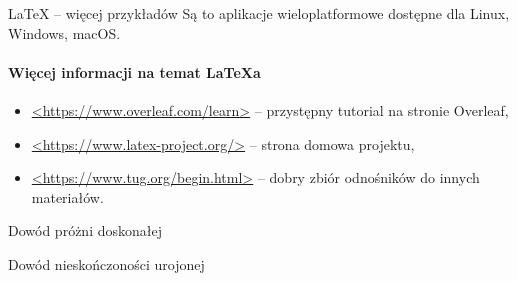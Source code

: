 \begin{easyappendix}{\LaTeX{} -- więcej przykładów}
Są to aplikacje wieloplatformowe dostępne dla Linux, Windows, macOS.


\paragraph{Więcej informacji na temat \LaTeX{a}}
\begin{itemize}
	\item \href{https://www.overleaf.com/learn}{<https://www.overleaf.com/learn>} -- przystępny tutorial na stronie Overleaf,
	\item \href{https://www.latex-project.org/}{<https://www.latex-project.org/>} -- strona domowa projektu,
	\item \href{https://www.tug.org/begin.html}{<https://www.tug.org/begin.html>} -- dobry zbiór odnośników do innych materiałów.
\end{itemize}


\end{easyappendix}

\begin{easyappendix}{Dowód próżni doskonałej}
\end{easyappendix}

\begin{easyappendix}{Dowód nieskończoności urojonej}
\end{easyappendix}
